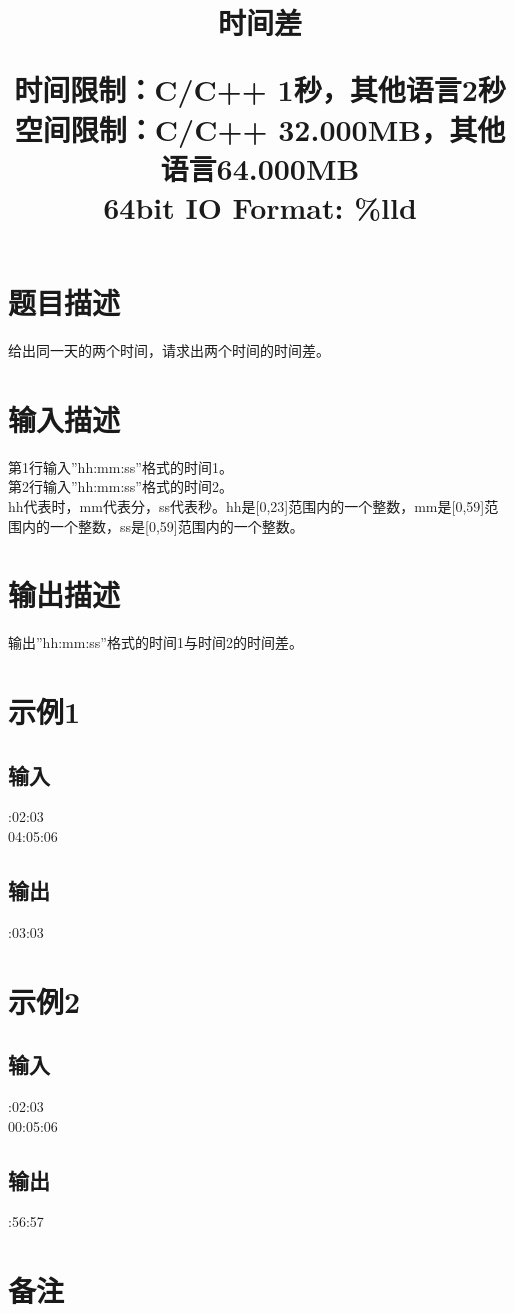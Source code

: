 \documentclass{article}
\date{}
\title{时间差 \\ [2ex] \begin{large} 
	时间限制：C/C++ 1秒，其他语言2秒 \\
	空间限制：C/C++ 32.000MB，其他语言64.000MB 	\\
	64bit IO Format: \%lld
 			\end{large} }
\begin{document}
		\maketitle \vspace{-50pt}
		
		\section*{题目描述}
		\indent 给出同一天的两个时间，请求出两个时间的时间差。

		\section*{输入描述}
			\noindent 第1行输入''hh:mm:ss''格式的时间1。\\
			\noindent 第2行输入''hh:mm:ss''格式的时间2。\\
			\noindent hh代表时，mm代表分，ss代表秒。hh是[0,23]范围内的一个整数，mm是[0,59]范围内的一个整数，ss是[0,59]范围内的一个整数。
		\section*{输出描述}
			\noindent 输出''hh:mm:ss''格式的时间1与时间2的时间差。
			
		\section*{示例1}
			\subsection*{输入}
:02:03\\
04:05:06

			\subsection*{输出}
:03:03

		\section*{示例2}
			\subsection*{输入}
:02:03\\
00:05:06

			\subsection*{输出}
:56:57
			
		\section*{备注}

	
\end{document}
